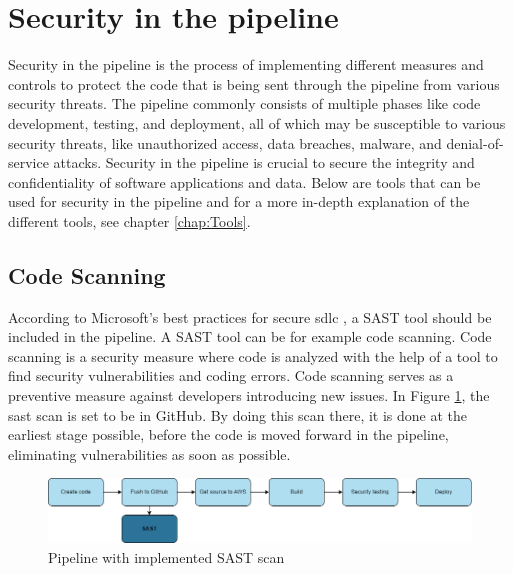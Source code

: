 \section{Security in the pipeline}
Security in the pipeline is the process of implementing different measures and controls to protect the code that is being sent through the pipeline from various security threats. The pipeline commonly consists of multiple phases like code development, testing, and deployment, all of which may be susceptible to various security threats, like unauthorized access, data breaches, malware, and denial-of-service attacks. Security in the pipeline is crucial to secure the integrity and confidentiality of software applications and data.
Below are tools that can be used for security in the pipeline and for a more in-depth explanation of the different tools, see chapter \ref{chap:Tools}. 

\subsection{Code Scanning}
\label{Code Scanning}
According to Microsoft's best practices for secure \acrshort{sdlc} \cite{microsoftSDLCpractices}, a SAST tool should be included in the pipeline. A SAST tool can be for example code scanning. Code scanning is a security measure where code is analyzed with the help of a tool to find security vulnerabilities and coding errors. Code scanning serves as a preventive measure against developers introducing new issues. In Figure \ref{fig: Pipeline with implemented SAST scan}, the \acrshort{sast} scan is set to be in GitHub. By doing this scan there, it is done at the earliest stage possible, before the code is moved forward in the pipeline, eliminating vulnerabilities as soon as possible.

 \vspace{2mm}
\begin{figure}[H]
    \centering
    \includegraphics[width=0.8\columnwidth]{Images/pipeline2.png}
    \caption{Pipeline with implemented SAST scan}
    \label{fig: Pipeline with implemented SAST scan}
\end{figure}

